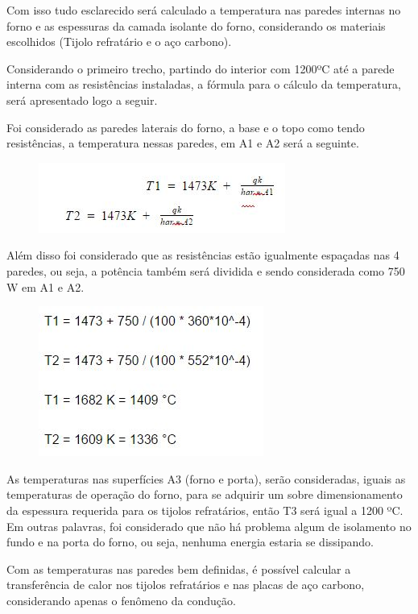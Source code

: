 Com isso tudo esclarecido será calculado a temperatura nas paredes internas no forno e as espessuras da camada isolante do forno, considerando os materiais escolhidos (Tijolo refratário e o aço carbono).

Considerando o primeiro trecho, partindo do interior com 1200ºC até a parede interna com as resistências instaladas, a fórmula para o cálculo da temperatura, será apresentado logo a seguir.

Foi considerado as paredes laterais do forno, a base e o topo como tendo resistências, a temperatura nessas paredes, em A1 e A2 será a seguinte.

\begin{figure}[!h]
	\centering
	\label{form2}
	\includegraphics[keepaspectratio=true,scale=1.0]{figuras/form2.JPG}
\end{figure}

Além disso foi considerado que as resistências estão igualmente espaçadas nas 4 paredes, ou seja, a potência também será dividida e sendo considerada como 750 W em A1 e A2.

\begin{figure}[!h]
	\centering
	\label{form3}
	\includegraphics[keepaspectratio=true,scale=1.0]{figuras/form3.JPG}
\end{figure}


As temperaturas nas superfícies A3 (forno e porta), serão consideradas, iguais as temperaturas de operação do forno, para se adquirir um sobre dimensionamento da espessura requerida para os tijolos refratários, então T3 será igual a 1200 ºC. Em outras palavras, foi considerado que não há problema algum de isolamento no fundo e na porta do forno, ou seja, nenhuma energia estaria se dissipando.

Com as temperaturas nas paredes bem definidas, é possível calcular a transferência de calor nos tijolos refratários e nas placas de aço carbono, considerando apenas o fenômeno da condução.

